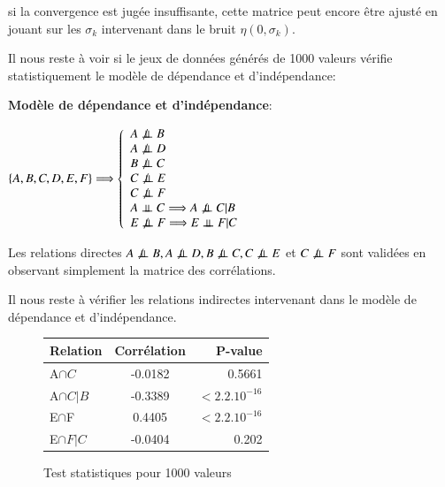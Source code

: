 \documentclass[a4paper]{article}
\begin{document}
\begin{appendices}
  
si la convergence est jugée insuffisante, cette matrice peut encore être ajusté en jouant sur les  $\sigma_{k}$ intervenant dans le bruit $\eta(0,\sigma_{k})$.




Il nous reste à voir si le jeux de données générés de 1000 valeurs vérifie statistiquement le modèle de dépendance et d'indépendance:

\textbf{Modèle de dépendance et d'indépendance}:

$\{ A,B,C,D,E,F \}\Longrightarrow\left\lbrace 
\begin{array}{lcl} 
A\not\ci B \\
A\not\ci D \\
B\not\ci C \\
C\not\ci E \\
C\not\ci F\\
A \ci C \Longrightarrow A\not\ci C |B\\
E\not\ci F\Longrightarrow E\ci F|C\\

\end{array}\right.$


Les relations directes $A\not\ci B,A\not\ci D,B\not\ci C,C\not\ci E$ et $C\not\perp\!\!\!\perp F$ sont validées en observant simplement la matrice des corrélations. 


Il nous reste à vérifier les relations indirectes intervenant dans le modèle de dépendance et d'indépendance.



\begin{figure}[H]
\begin{center}
\begin{tabular}{|l|c|r|}
  \hline
  Relation & Corrélation & P-value \\
  \hline
  A$\cap C$&  -0.0182 & 0.5661\\
A$\cap C|B$&  -0.3389 & $<2.2.10^{-16}$\\

\hline
E$\cap$F&0.4405&$<2.2.10^{-16}$\\
E$\cap F|C$&-0.0404&0.202\\
\hline
\end{tabular}
\end{center}
\caption{Test statistiques pour 1000 valeurs }
\end{figure}













\end{appendices}
\end{document}
